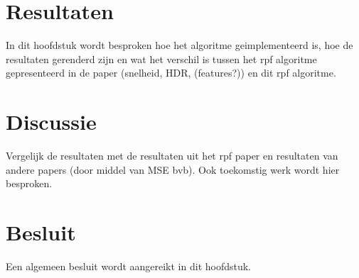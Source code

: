 \documentclass[master=cws, masteroption=mmc]{kulemt}
\begin{document}
      
    \chapter{Resultaten}
      In dit hoofdstuk wordt besproken hoe het algoritme geimplementeerd is, 
      hoe de resultaten gerenderd zijn en wat het verschil is tussen het rpf algoritme gepresenteerd in de paper (snelheid, HDR, (features?)) en dit rpf algoritme.
    
    \chapter{Discussie}
      Vergelijk de resultaten met de resultaten uit het rpf paper en resultaten van andere papers (door middel van MSE bvb).
      Ook toekomstig werk wordt hier besproken.
      
    \chapter{Besluit}
      Een algemeen besluit wordt aangereikt in dit hoofdstuk.
    
    
    

    
    

  
\end{document}
